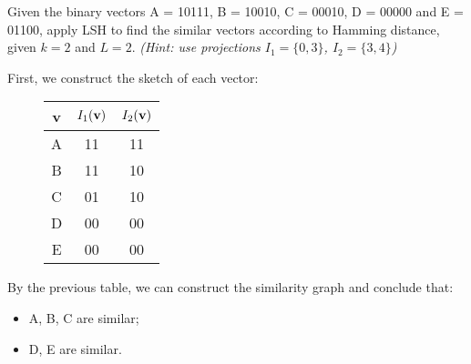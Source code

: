 \exercise

Given the binary vectors A = 10111, B = 10010, C = 00010, D = 00000 and E =
01100, apply LSH to find the similar vectors according to Hamming distance,
given $k = 2$ and $L = 2$. \emph{(Hint: use projections $I_1 = \{0, 3\}$, $I_2 =
\{3, 4\}$)}

\solution

First, we construct the sketch of each vector:
%
\begin{figure}[H]
  \hfill
  \begin{minipage}{0.45\columnwidth}
  \centering
  \begin{tabular}{c|c|c}
    {\bf v} & $I_1(\text{\bf v})$ & $I_2(\text{\bf v})$ \\ \hline
    A & 11 & 11 \\
    B & 11 & 10 \\
    C & 01 & 10 \\
    D & 00 & 00 \\
    E & 00 & 00 \\
  \end{tabular}
  \end{minipage}
  \begin{minipage}{0.45\columnwidth}
  \end{minipage}
  \hfill
\end{figure}
%
By the previous table, we can construct the similarity graph and conclude that:
%
\begin{itemize}
  \item A, B, C are similar;
  \item D, E are similar.
\end{itemize}

